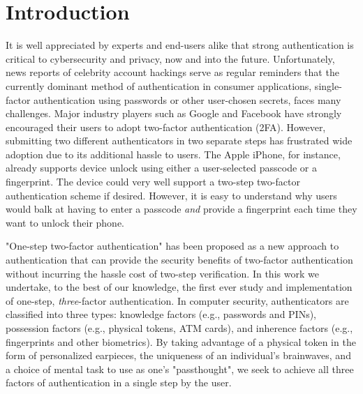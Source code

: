 \documentclass{sigchi}
\begin{document}

\section{Introduction}

It is well appreciated by experts and end-users alike that strong authentication is
critical to cybersecurity and privacy, now and into the future. Unfortunately,
news reports of celebrity account hackings serve as regular reminders that
the currently dominant method of authentication in consumer applications, 
single-factor authentication using passwords or other user-chosen secrets, 
faces many challenges. Major industry players such as Google and
Facebook have strongly encouraged their users to adopt two-factor
authentication (2FA). However, submitting two different 
authenticators in two separate steps has frustrated wide adoption
due to its additional hassle to users. The Apple iPhone, for instance,
already supports device unlock using either a user-selected passcode or a fingerprint. The
device could very well support a two-step two-factor authentication scheme if
desired. However, it is easy to understand why users would balk at having to
enter a passcode \emph{and} provide a fingerprint each time they want to unlock their phone.

"One-step two-factor authentication" has been proposed as a new approach
to authentication that can provide the security benefits of two-factor authentication without incurring the hassle cost of two-step verification.
In this work we undertake, to the best of our knowledge, the first
ever study and implementation of one-step, \textit{three}-factor authentication. In computer security, authenticators are classified into three types: knowledge factors (e.g., passwords
and PINs), possession factors (e.g., physical tokens, ATM cards), and inherence
factors (e.g., fingerprints and other biometrics). By taking advantage of a physical token 
in the form of personalized earpieces, the uniqueness of an individual's brainwaves, and
a choice of mental task to use as one's "passthought", we seek to achieve all three factors 
of authentication in a single step by the user.
\end{document}
